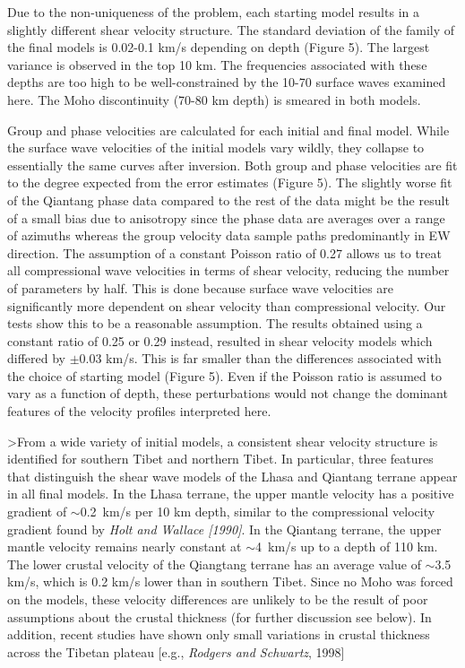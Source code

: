 \documentclass[12pt]{article}
\begin{document}
Due to the non-uniqueness of the problem, each starting model results in a slightly different shear 
velocity structure.  The standard deviation of the family of the final models is 0.02-0.1 km/s depending on 
depth (Figure 5).  The largest variance is observed in the top 10 km.  The frequencies associated with 
these depths are too high to be well-constrained by the 10-70 surface waves examined here. The Moho discontinuity (70-80 km depth) is smeared in both models. 

Group and phase velocities are calculated for each initial and final model.  While the surface wave 
velocities of the initial models vary wildly, they collapse to essentially the same curves after inversion. 
Both group and phase velocities are fit to the degree expected from the error
  estimates (Figure 5).   The slightly worse fit of the Qiantang phase data
  compared to the rest of the data might be the result of a small bias due to
  anisotropy since the phase data are averages over a range of azimuths whereas the
  group velocity data sample paths predominantly in EW direction. 
The assumption of a constant Poisson ratio of 0.27 allows us to treat all compressional wave velocities in 
terms of shear velocity, reducing the number of parameters by half. This is done because surface wave 
velocities are significantly more dependent on shear velocity than compressional velocity.  Our tests show 
this to be a reasonable assumption.  The results obtained using a constant ratio of 0.25 or 0.29 instead, 
resulted in shear velocity models which differed by $\pm$0.03 km/s.  This is far smaller than the differences 
associated with the choice of starting model (Figure 5).  Even if the Poisson ratio is assumed to vary as a 
function of depth, these perturbations would not change the dominant features of the 
velocity profiles interpreted here. 

>From a wide variety of initial models, a consistent shear velocity structure is identified for southern 
Tibet and northern Tibet. In particular, three features that distinguish the shear wave models of the Lhasa and Qiantang terrane appear in all final models.  
In the Lhasa terrane, the upper mantle velocity has a positive gradient of $\sim$0.2~km/s per 10 km depth, 
similar to the compressional velocity gradient found by {\it Holt and Wallace [1990]}.  In the Qiantang terrane, 
the upper mantle velocity remains nearly constant at $\sim$4~km/s up to a depth of 110 km. The lower crustal 
velocity of the Qiangtang terrane has an average value of $\sim$3.5 km/s, which is 0.2 km/s lower than in 
southern Tibet.  Since no Moho was forced on the models, these velocity differences are       unlikely to be the 
result of poor assumptions about the crustal thickness (for further
discussion see below).  In addition, recent studies have shown only small variations 
in crustal thickness across the Tibetan plateau [e.g., {\it Rodgers and Schwartz}, 1998]
\end{document}
